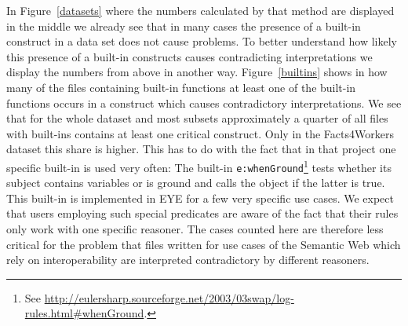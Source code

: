 In Figure~\ref{datasets} where the numbers calculated by that method are displayed 
in the middle we already see that in many cases the presence of a built-in construct in a data set does not cause problems. 
To better understand how likely this presence of a built-in constructs causes contradicting interpretations we display the numbers from above in another way.
Figure~\ref{builtins} shows in how many of the files containing built-in functions at least one of the built-in functions occurs in a construct which causes 
contradictory interpretations.
%
% 
%  
We see that for the whole dataset and most subsets approximately a quarter of all 
files with built-ins contains at least one critical construct. Only in the Facts4Workers dataset this share is higher.
This has to do with the fact that in that project one specific built-in is used very often: 
 The built-in \texttt{e:whenGround}\footnote{See \url{http://eulersharp.sourceforge.net/2003/03swap/log-rules.html\#whenGround}. }
 tests whether its subject contains variables or is ground and calls the object if the latter is true. This built-in is implemented in EYE for
 a few very specific use cases. We expect that users employing such special predicates are aware of the fact that their rules only work with one specific reasoner.
 The cases counted here are therefore less critical for the problem that files written for use cases of the Semantic Web which rely on interoperability are interpreted 
 contradictory by different reasoners.
 


